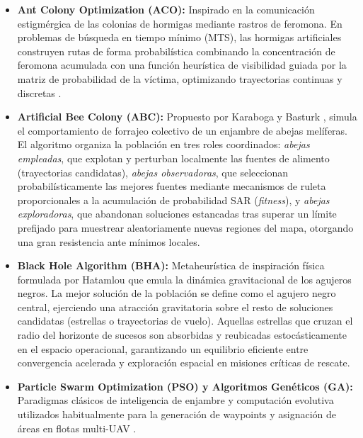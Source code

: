 \begin{itemize}
	\item \textbf{Ant Colony Optimization (ACO):} 
	Inspirado en la comunicación estigmérgica de las colonias de hormigas mediante rastros de feromona. En problemas de búsqueda en tiempo mínimo (MTS), las hormigas artificiales construyen rutas de forma probabilística combinando la concentración de feromona acumulada con una función heurística de visibilidad guiada por la matriz de probabilidad de la víctima, optimizando trayectorias continuas y discretas \cite{carabaza-ACOr, carabaza_ingles}.
	
	\item \textbf{Artificial Bee Colony (ABC):} 
	Propuesto por Karaboga y Basturk \cite{karaboga2007}, simula el comportamiento de forrajeo colectivo de un enjambre de abejas melíferas. El algoritmo organiza la población en tres roles coordinados: \textit{abejas empleadas}, que explotan y perturban localmente las fuentes de alimento (trayectorias candidatas), \textit{abejas observadoras}, que seleccionan probabilísticamente las mejores fuentes mediante mecanismos de ruleta proporcionales a la acumulación de probabilidad SAR (\textit{fitness}), y \textit{abejas exploradoras}, que abandonan soluciones estancadas tras superar un límite prefijado para muestrear aleatoriamente nuevas regiones del mapa, otorgando una gran resistencia ante mínimos locales.
	
	\item \textbf{Black Hole Algorithm (BHA):} 
	Metaheurística de inspiración física formulada por Hatamlou \cite{hatamlou2012} que emula la dinámica gravitacional de los agujeros negros. La mejor solución de la población se define como el agujero negro central, ejerciendo una atracción gravitatoria sobre el resto de soluciones candidatas (estrellas o trayectorias de vuelo). Aquellas estrellas que cruzan el radio del horizonte de sucesos son absorbidas y reubicadas estocásticamente en el espacio operacional, garantizando un equilibrio eficiente entre convergencia acelerada y exploración espacial en misiones críticas de rescate.
	
	\item \textbf{Particle Swarm Optimization (PSO) y Algoritmos Genéticos (GA):} 
	Paradigmas clásicos de inteligencia de enjambre y computación evolutiva utilizados habitualmente para la generación de waypoints y asignación de áreas en flotas multi-UAV \cite{alqudsi2025, huang2024}.
\end{itemize}

